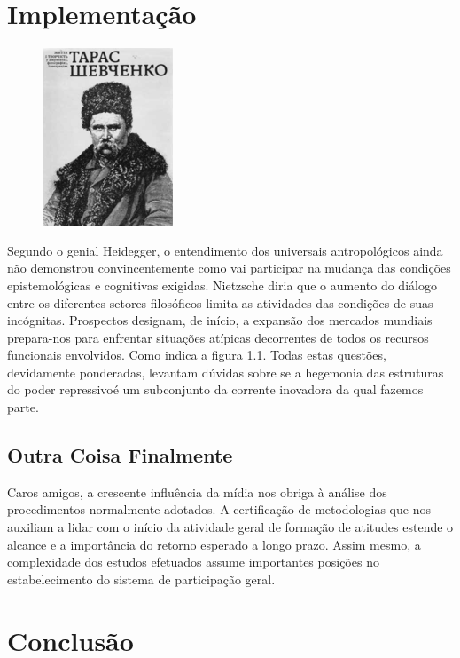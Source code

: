 \documentclass[chapter=TITLE,section=Title,espaco=duplo,tocpage=plain,appendix=Name,floatnumber=continuous]{abnt}
\begin{document}
\chapter{Implementação}

\begin{figure}[h!]
  \centering
  \includegraphics{taras.png}
  \label{fig:shevchenko}
\end{figure}

Segundo o genial Heidegger, o entendimento dos universais antropológicos
ainda não demonstrou convincentemente como vai participar na mudança das
condições epistemológicas e cognitivas exigidas. Nietzsche diria que o
aumento do diálogo entre os diferentes setores filosóficos limita as
atividades das condições de suas incógnitas. Prospectos designam, de
início, a expansão dos mercados mundiais prepara-nos para enfrentar
situações atípicas decorrentes de todos os recursos funcionais envolvidos.
Como indica a figura \ref{fig:shevchenko}. Todas estas questões,
devidamente ponderadas, levantam dúvidas sobre se a hegemonia das
estruturas do poder repressivoé um subconjunto da corrente inovadora da
qual fazemos parte.

\section{Outra Coisa Finalmente}

Caros amigos, a crescente influência da mídia nos obriga à análise dos
procedimentos normalmente adotados. A certificação de metodologias que nos
auxiliam a lidar com o início da atividade geral de formação de atitudes
estende o alcance e a importância do retorno esperado a longo prazo. Assim
mesmo, a complexidade dos estudos efetuados assume importantes posições no
estabelecimento do sistema de participação geral.

\chapter{Conclusão}
\end{document}
